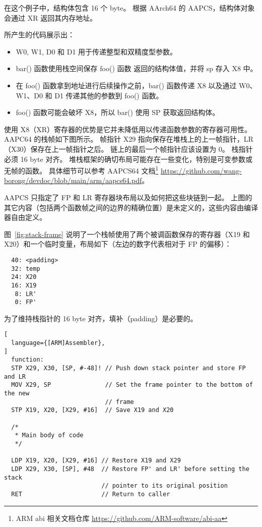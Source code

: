 在这个例子中，结构体包含 16 个 byte。
根据 AArch64 的 AAPCS，结构体对象会通过 XR 返回其内存地址。

所产生的代码展示出：

\begin{itemize}
  \item W0, W1, D0 和 D1 用于传递整型和双精度型参数。
  \item bar() 函数使用栈空间保存 foo() 函数 返回的结构体值，并将 sp 存入 X8 中。
  \item 在 foo() 函数拿到地址进行后续操作之前，bar() 函数传递 X8 以及通过 W0、W1、D0 和 D1 传递其他的参数到 foo() 函数。
  \item foo() 函数可能会破坏 X8，所以 bar() 使用 SP 获取返回结构体。
\end{itemize}

使用 X8（XR）寄存器的优势是它并未降低用以传递函数参数的寄存器可用性。
AAPC64 的栈帧如下图所示。
帧指针 X29 指向保存在堆栈上的上一帧指针，LR（X30）保存在上一帧指针之后。
链上的最后一个帧指针应该设置为 0。
栈指针必须 16 byte 对齐。
堆栈框架的确切布局可能存在一些变化，特别是可变参数或无帧的函数。
具体细节可以参考 AAPCS64 文档\footnote{ARM abi 相关文档仓库 \url{https://github.com/ARM-software/abi-aa}} \url{https://github.com/wang-borong/devdoc/blob/main/arm/aapcs64.pdf}。


\begin{Tcbox}[title={Note}]
  AAPCS 只指定了 FP 和 LR 寄存器块布局以及如何把这些块链到一起。
  上图的其它内容（包括两个函数帧之间的边界的精确位置）是未定义的，这些内容由编译器自由定义。
\end{Tcbox}

图~\ref{fig:stack-frame} 说明了一个栈帧使用了两个被调函数保存的寄存器（X19 和 X20）和一个临时变量，布局如下（左边的数字代表相对于 FP 的偏移）：

\begin{lstlisting}
  40: <padding>
  32: temp
  24: X20
  16: X19
   8: LR'
   0: FP'
\end{lstlisting}

为了维持栈指针的 16 byte 对齐，填补（padding）是必要的。

\begin{lstlisting}[
  language={[ARM]Assembler},
]
  function:
  STP X29, X30, [SP, #-48]! // Push down stack pointer and store FP and LR
  MOV X29, SP               // Set the frame pointer to the bottom of the new
                            // frame
  STP X19, X20, [X29, #16]  // Save X19 and X20

  /*
   * Main body of code
   */

  LDP X19, X20, [X29, #16] // Restore X19 and X29
  LDP X29, X30, [SP], #48  // Restore FP' and LR' before setting the stack
                           // pointer to its original position
  RET                      // Return to caller
\end{lstlisting}

